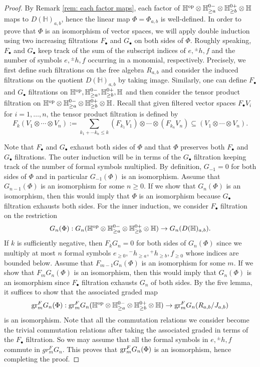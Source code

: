 \documentclass[10pt]{amsart}
\newcommand{\BH}{\mathbb{H}}
\newcommand{\op}{\textnormal{op}}
\newcommand{\+}{{}^+}
\newcommand{\gr}{\textnormal{gr}}
\theoremstyle{definition}
\theoremstyle {definition}
\theoremstyle {definition}
\begin{document}
\begin{proof}
    By Remark \ref{rem: each factor maps}, each factor of $\BH^{\op}\otimes \BH^{0-}_{\geq a}\otimes \BH^{0+}_{\geq b}\otimes \BH$ maps to $D(\BH)_{a,b}$, hence the linear map $\Phi=\Phi_{a,b}$ is well-defined. In order to prove that $\Phi$ is an isomorphism of vector spaces, we will apply double induction using two increasing filtrations $F_\bullet$ and $G_\bullet$ on both sides of $\Phi$. Roughly speaking, $F_\bullet$ and $G_\bullet$ keep track of the sum of the subscript indices of $e, {}^{\pm}h, f$ and the number of symbols $e, {}^{\pm}h, f$ occurring in a monomial, respectively. Precisely, we first define such filtrations on the free algebra $R_{a,b}$ and consider the induced filtrations on the quotient $D(\BH)_{a,b}$ by taking image. Similarly, one can define $F_\bullet$ and $G_\bullet$ filtrations on $\BH^{\textnormal{op}}, \BH^{0-}_{\geq a}, \BH^{0+}_{\geq b}, \BH$ and then consider the tensor product filtration on $\BH^{\op}\otimes \BH^{0-}_{\geq a}\otimes \BH^{0+}_{\geq b}\otimes \BH$. Recall that given filtered vector spaces $F_\bullet V_i$ for $i=1, \dots, n$, the tensor product filtration is defined by 
    $$F_k (V_1\otimes \cdots \otimes V_n):=\sum_{k_1+\cdots k_n\leq k} (F_{k_1}V_1)\otimes \cdots\otimes (F_{k_n}V_n)\subseteq (V_1\otimes \cdots\otimes V_n).
    $$

    Note that $F_\bullet$ and $G_\bullet$ exhaust both sides of $\Phi$ and that $\Phi$ preserves both $F_\bullet$ and $G_\bullet$ filtrations. The outer induction will be in terms of the $G_\bullet$ filtration keeping track of the number of formal symbols multiplied. By definition, $G_{-1}=0$ for both sides of $\Phi$ and in particular $G_{-1}(\Phi)$ is an isomorphism. Assume that $G_{n-1}(\Phi)$ is an isomorphism for some $n\geq 0$. If we show that $G_{n}(\Phi)$ is an isomorphism, then this would imply that $\Phi$ is an isomorphism because $G_\bullet$ filtration exhausts both sides. For the inner induction, we consider $F_\bullet$ filtration on the restriction 
    $$G_{n}(\Phi):G_{n}(\BH^{\op}\otimes \BH^{0-}_{\geq a}\otimes \BH^{0+}_{\geq b}\otimes \BH)\rightarrow G_{n}(D(\BH)_{a,b}).
    $$
    If $k$ is sufficiently negative, then $F_{k}G_{n}=0$ for both sides of $G_{n}(\Phi)$ since we multiply at most $n$ formal symbols $e_{\geq 0}, {}^{-}h_{\geq a}, {}^{+}h_{\geq b}, f_{\geq 0}$ whose indices are bounded below. Assume that $F_{m-1}G_{n}(\Phi)$ is an isomorphism for some $m$. If we show that $F_{m}G_n(\Phi)$ is an isomorphism, then this would imply that $G_n(\Phi)$ is an isomorphism since $F_\bullet$ filtration exhausts $G_n$ of both sides. By the five lemma, it suffices to show that the associated graded map
    $$\gr^F_m G_n(\Phi):\gr^F_mG_{n}(\BH^{\op}\otimes \BH^{0-}_{\geq a}\otimes \BH^{0+}_{\geq b}\otimes \BH)\rightarrow \gr^F_mG_{n}(R_{a,b}/J_{a,b})
    $$
    is an isomorphism. Note that all the commutation relations we consider become the trivial commutation relations after taking the associated graded in terms of the $F_\bullet$ filtration. So we may assume that all the formal symbols in $e, {}^{\pm}h, f$ commute in $gr^F_m G_n$. This proves that $\gr^F_m G_n(\Phi)$ is an isomorphism, hence completing the proof.     
\end{proof}
\end{document}
